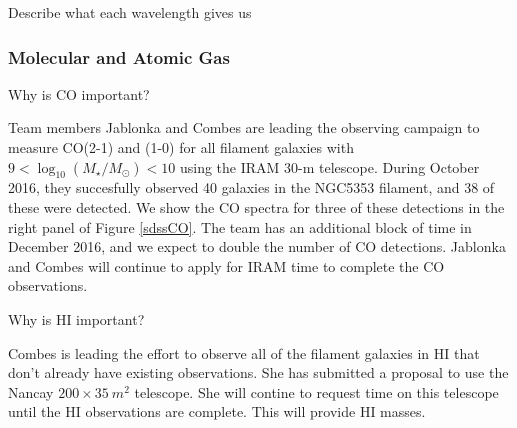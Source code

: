 \documentclass[12pt, preprint]{aastex}
\begin{document}
Describe what each wavelength gives us

\vspace*{-1cm}
\subsubsection{Molecular and Atomic Gas}
\vspace*{-.3cm}
Why is CO important?

Team members Jablonka and Combes are leading the observing campaign to
measure CO(2-1) and (1-0)  for all filament galaxies with $9 <
\log_{10}(M_\star/M_\odot) < 10$ using the IRAM 30-m telescope.
During October 2016, they succesfully observed 40 galaxies in the
NGC5353 filament, and 38 of these were detected.  We show the CO
spectra for three of these detections in the right panel of Figure
\ref{sdssCO}.  The team has an additional block of time in December
2016, and we expect to double the number of CO detections.  Jablonka
and Combes will continue to apply for IRAM time to complete the CO observations.

Why is HI important?

Combes is leading the effort to observe all of the filament galaxies
in HI that don't already have existing observations.  She has
submitted a proposal to use the Nancay $200 \times 35~m^2$ telescope.
She will contine to request time on this telescope until the HI
observations are complete.  This will provide HI masses.
\end{document}
